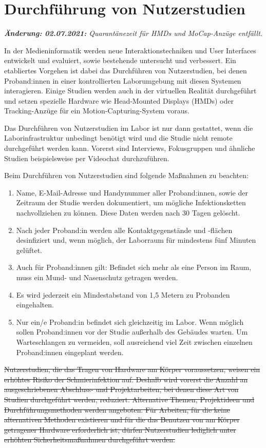 \section{Durchführung von Nutzerstudien}\label{sec:nutzerstudien}
\emph{\textbf{Änderung: 02.07.2021:} Quarantänezeit für HMDs und MoCap-Anzüge entfällt. }

\noindent
In der Medieninformatik werden neue Interaktionstechniken und User Interfaces entwickelt und evaluiert, sowie bestehende untersucht und verbessert. Ein etabliertes Vorgehen ist dabei das Durchführen von Nutzerstudien, bei denen Proband:innen in einer kontrollierten Laborumgebung mit diesen Systemen interagieren. Einige Studien werden auch in der virtuellen Realität durchgeführt und setzen spezielle Hardware wie Head-Mounted Displays (HMDs) oder Tracking-Anzüge für ein Motion-Capturing-System voraus.

\medskip
\noindent
Das Durchführen von Nutzerstudien im Labor ist nur dann gestattet, wenn die Laborinfrastruktur unbedingt benötigt wird und die Studie nicht remote durchgeführt werden kann. Vorerst sind Interviews, Fokusgruppen und ähnliche Studien beispielsweise per Videochat durchzuführen.

\noindent
Beim Durchführen von Nutzerstudien sind folgende Maßnahmen zu beachten:

\begin{enumerate}
    \item Name, E-Mail-Adresse und Handynummer aller Proband:innen, sowie der Zeitraum der Studie werden dokumentiert, um mögliche Infektionsketten nachvollziehen zu können. Diese Daten werden nach 30 Tagen gelöscht.
    \item Nach jeder Proband:in werden alle Kontaktgegenstände und -flächen desinfiziert und, wenn möglich, der Laborraum für mindestens fünf Minuten gelüftet.
    \item Auch für Proband:innen gilt: Befindet sich mehr als eine Person im Raum, muss ein Mund- und Nasenschutz getragen werden.
    \item Es wird jederzeit ein Mindestabstand von 1,5 Metern zu Probanden eingehalten.
    \item Nur ein/e Proband:in befindet sich gleichzeitig im Labor. Wenn möglich sollen Proband:innen vor der Studie außerhalb des Gebäudes warten. Um Warteschlangen zu vermeiden, soll ausreichend viel Zeit zwischen einzelnen Proband:innen eingeplant werden.
\end{enumerate}

\noindent
\sout{Nutzerstudien, die das Tragen von Hardware am Körper voraussetzen, weisen ein erhöhtes Risiko der Schmierinfektion auf. Deshalb wird vorerst die Anzahl an ausgeschriebenen Abschluss- und Projektarbeiten, bei denen diese Art von Studien durchgeführt werden, reduziert. Alternative Themen, Projektideen und Durchführungsmethoden werden angeboten.
Für Arbeiten, für die keine alternativen Methoden existieren und für die das Benutzen von am Körper getragener Hardware erforderlich ist, dürfen Nutzerstudien lediglich unter erhöhten Sicherheitsmaßnahmen durchgeführt werden.}

